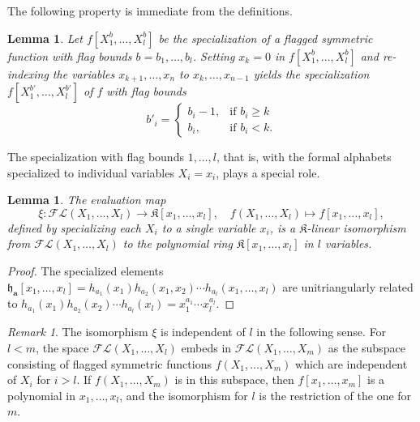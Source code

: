 \documentclass[12pt]{amsart}
\newtheorem{lemma}[thm]{Lemma}
\theoremstyle{definition}
\theoremstyle{remark}
\newtheorem{remark}[thm]{Remark}
\newcommand{\aA}{{\mathbf a}}
\newcommand{\fh}{{\mathfrak h}}
\newcommand{\Kfrak}{{\mathfrak K}}
\newcommand{\FLambda}{\mathcal{F\!L}}
\begin{document}
The following property is immediate from the definitions.

\begin{lemma}\label{lem:xk=0}
Let $f[X^b_{1},\ldots,X^b_{l}]$ be the specialization of a flagged
symmetric function with flag bounds $b = b_{1},\ldots, b_{l}$.
Setting $x_{k} = 0$ in $f[X^b_{1},\ldots,X^b_{l}]$ and re-indexing the
variables $x_{k+1},\ldots,x_{n}$ to $x_{k},\ldots,x_{n-1}$ yields the
specialization $f[X^{b'}_{1},\ldots,X^{b'}_{l}]$ of $f$ with flag
bounds
\[
b'_{i} = \begin{cases}
b_{i}-1,&	\text{if $b_{i}\geq k$}\\
b_{i},&		\text{if $b_{i}< k$}.
\end{cases}
\]
\end{lemma}

The specialization with flag bounds $1,\ldots,l$, that is, with
the formal alphabets specialized to individual variables $X_{i} =
x_{i}$, plays a special role.

\begin{lemma}\label{lem:X=x}
The evaluation map
\begin{equation}\label{e:X=x-map}
\xi \colon \FLambda(X_{1},\ldots,X_{l}) \rightarrow \Kfrak
[x_{1},\ldots,x_{l}],\quad f(X_{1},\ldots,X_{l}) \mapsto
f[x_{1},\ldots,x_{l}],
\end{equation}
defined by specializing each $X_{i}$ to a single variable $x_{i}$, is
a $\Kfrak $-linear isomorphism from $\FLambda (X_{1},\ldots,X_{l})$ to
the polynomial ring $\Kfrak [x_{1},\ldots,x_{l}]$ in $l$ variables.
\end{lemma}

\begin{proof}
The specialized elements ${\fh}_{\aA }[x_{1},\ldots,x_{l}] =
h_{a_{1}}(x_{1})h_{a_{2}}(x_{1},x_{2})\cdots
h_{a_{l}}(x_{1},\ldots,x_{l})$ are unitriangularly related to
$h_{a_{1}}(x_{1})h_{a_{2}}(x_{2})\cdots h_{a_{l}}(x_{l}) =
x_{1}^{a_{1}}\cdots x_{l}^{a_{l}}$.
\end{proof}

\begin{remark}\label{rem:X=x}
The isomorphism $\xi $ is independent of $l$ in the following sense.
For $l<m$, the space $\FLambda(X_{1},\ldots,X_{l})$ embeds in $\FLambda
(X_{1},\ldots,X_{m})$ as the subspace consisting of flagged symmetric
functions $f(X_{1},\ldots,X_{m})$ which are independent of $X_{i}$ for
$i>l$.  If $f(X_{1},\ldots,X_{m})$ is in this subspace, then
$f[x_{1},\ldots,x_{m}]$ is a polynomial in $x_{1},\ldots,x_{l}$, and
the isomorphism for $l$ is the restriction of the one for $m$.
\end{remark}
\end{document}
